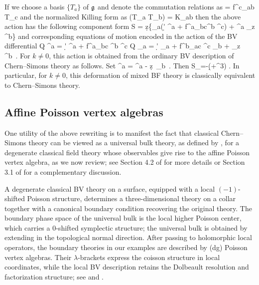 \documentclass[11pt]{amsart}
\numberwithin{equation}{section}
\numberwithin{figure}{section}
\numberwithin{table}{section}
\begin{document}
If we choose a basis $\{T_a\}$ of $\mathfrak{g}$ and denote the commutation relations as
\be
	[T_a, T_b] = f^c_{ab} T_c
\ee
and the normalized Killing form as
\be
	\Tr(T_a T_b) = K_{ab}
\ee
then the above action has the following component form
\be
	S = \int \d z\left\{\bB_a\big(\d' \bA^a + f^a_{bc}\bA^b \bA^c\big) +  \bA^a \partial_z \bA^b\right\}
\ee
and corresponding equations of motion encoded in the action of the BV differential
\be
	Q \bA^a = \d' \bA^a +  f^a_{bc} \bA^b \bA^c \qquad Q \bB_a = \d' \bB_a + f^b_{ac} \bA^c \bB_b +  \partial_z \bA^b~.
\ee
For $k\neq0$, this action is obtained from the ordinary BV description of Chern--Simons theory as follows.
Set
\be
    \CA^a = \bA^a - \d z\, \bB_b~.
\ee
Then
\be
    S_{}=-\int\Tr\left(\CA\d\CA+\CA^3\right) .
\ee
In particular, for $k \ne 0$, this deformation of mixed BF theory is classically equivalent to Chern--Simons theory.

\subsection{Affine Poisson vertex algebras}\label{sec:AffinePVA}
One utility of the above rewriting is to manifest the fact that classical Chern--Simons theory can be viewed as a universal bulk theory, as defined by \cite{Butson:2016jys}, for a degenerate classical field theory whose observables give rise to the affine Poisson vertex algebra, as we now review; see Section 4.2 of \cite{Butson:2016jys} for more details or Section 3.1 of \cite{Khan:2025rah} for a complementary discussion.

A degenerate classical BV theory on a surface, equipped with a local $(-1)$-shifted Poisson structure, determines a three-dimensional theory on a collar together with a canonical boundary condition recovering the original theory.
The boundary phase space of the universal bulk is the local higher Poisson center, which carries a $0$-shifted symplectic structure;
the universal bulk is obtained by extending in the topological normal direction.
After passing to holomorphic local operators, the boundary theories in our examples are described by
(dg) Poisson vertex algebras.
Their $\lambda$-brackets express the coisson structure in local coordinates, while the local BV description retains the Dolbeault resolution and factorization structure; see \cite[Sec.~2.6]{Beilinson:2004chiral} and \cite[Secs.~4.3--4.4]{Butson:2016jys}.
\end{document}
